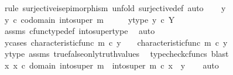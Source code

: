 \begin{isabellebody}
%
\isadelimproof
%
\endisadelimproof
%
\isatagproof
{}\isamarkupfalse%
\ {\isacharparenleft}{\kern0pt}rule\ surjective{\isacharunderscore}{\kern0pt}is{\isacharunderscore}{\kern0pt}epimorphism{\isacharcomma}{\kern0pt}\ unfold\ surjective{\isacharunderscore}{\kern0pt}def{\isacharcomma}{\kern0pt}\ auto{\isacharparenright}{\kern0pt}\isanewline
\ \ \isamarkupfalse%
\ y\isanewline
\ \ \isamarkupfalse%
\ {\isachardoublequoteopen}y\ {\isasymin}\isactrlsub c\ codomain\ {\isacharparenleft}{\kern0pt}into{\isacharunderscore}{\kern0pt}super\ m{\isacharparenright}{\kern0pt}{\isachardoublequoteclose}\isanewline
\ \ \isamarkupfalse%
\ \isamarkupfalse%
\ y{\isacharunderscore}{\kern0pt}type{\isacharcolon}{\kern0pt}\ {\isachardoublequoteopen}y\ {\isasymin}\isactrlsub c\ Y{\isachardoublequoteclose}\isanewline
\ \ \ \ \isamarkupfalse%
\ assms\ cfunc{\isacharunderscore}{\kern0pt}type{\isacharunderscore}{\kern0pt}def\ into{\isacharunderscore}{\kern0pt}super{\isacharunderscore}{\kern0pt}type\ \isamarkupfalse%
\ auto\isanewline
\isanewline
\ \ \isamarkupfalse%
\ y{\isacharunderscore}{\kern0pt}cases{\isacharcolon}{\kern0pt}\ {\isachardoublequoteopen}{\isacharparenleft}{\kern0pt}characteristic{\isacharunderscore}{\kern0pt}func\ m\ {\isasymcirc}\isactrlsub c\ y\ {\isacharequal}{\kern0pt}\ {\isasymt}{\isacharparenright}{\kern0pt}\ {\isasymor}\ {\isacharparenleft}{\kern0pt}characteristic{\isacharunderscore}{\kern0pt}func\ m\ {\isasymcirc}\isactrlsub c\ y\ {\isacharequal}{\kern0pt}\ {\isasymf}{\isacharparenright}{\kern0pt}{\isachardoublequoteclose}\isanewline
\ \ \ \ \isamarkupfalse%
\ y{\isacharunderscore}{\kern0pt}type\ assms\ true{\isacharunderscore}{\kern0pt}false{\isacharunderscore}{\kern0pt}only{\isacharunderscore}{\kern0pt}truth{\isacharunderscore}{\kern0pt}values\ \isamarkupfalse%
\ {\isacharparenleft}{\kern0pt}typecheck{\isacharunderscore}{\kern0pt}cfuncs{\isacharcomma}{\kern0pt}\ blast{\isacharparenright}{\kern0pt}\isanewline
\ \ \isamarkupfalse%
\ \isamarkupfalse%
\ {\isachardoublequoteopen}{\isasymexists}x{\isachardot}{\kern0pt}\ x\ {\isasymin}\isactrlsub c\ domain\ {\isacharparenleft}{\kern0pt}into{\isacharunderscore}{\kern0pt}super\ m{\isacharparenright}{\kern0pt}\ {\isasymand}\ into{\isacharunderscore}{\kern0pt}super\ m\ {\isasymcirc}\isactrlsub c\ x\ {\isacharequal}{\kern0pt}\ y{\isachardoublequoteclose}\isanewline
\ \ \isamarkupfalse%
\ auto\isanewline

\end{isabellebody}
